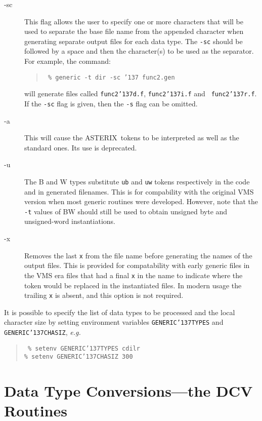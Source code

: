 \documentclass[twoside,11pt]{article}
\renewcommand{\_}{{\tt\char'137}}     %
\newcommand{\ASTERIX}{{\footnotesize ASTERIX}\normalsize}
\begin{document}
\begin{description}
\item[-sc] This flag allows the user to specify one or more characters
that will be used to separate the base file name from the appended
character when generating separate output files for each data type.
The {\tt -sc} should be followed by a space and then the character(s)
to be used as the separator.  For example, the command:

\begin{quote}{\tt
\% generic -t dir -sc \_ func2.gen
}
\end{quote}

will generate files called {\tt func2\_d.f}, {\tt func2\_i.f} and {\tt
func2\_r.f}.  If the {\tt -sc} flag is given, then the {\tt -s} flag can be
omitted.

\item[-a] This will cause the \ASTERIX\ tokens to be interpreted as well as the
standard ones.  Its use is deprecated.

\item[-u]  The B and W types substitute {\tt ub} and {\tt uw} tokens
respectively in the code and in generated filenames.  This is for
compability with the original VMS version when most generic routines were
developed.  However, note that the {\tt -t} values of BW should still be
used to obtain unsigned byte and unsigned-word instantiations.

\item[-x]  Removes the last {\tt x} from the file name before generating the
names of the output files.  This is provided for compatability
with early generic files in the VMS era files that had a final {\tt x} in the
name to indicate where the token would be replaced in the
instantiated files.  In modern usage the trailing {\tt x} is absent, and
this option is not required.

\end{description}

It is possible to specify the list of data types to be processed and the local
character size by setting environment variables {\tt GENERIC\_TYPES} and {\tt
GENERIC\_CHASIZ}, \emph{e.g.}

\begin{quote}{\tt
\% setenv GENERIC\_TYPES cdilr \\
\% setenv GENERIC\_CHASIZ 300
}
\end{quote}

\section{Data Type Conversions---the DCV Routines}
\end{document}
